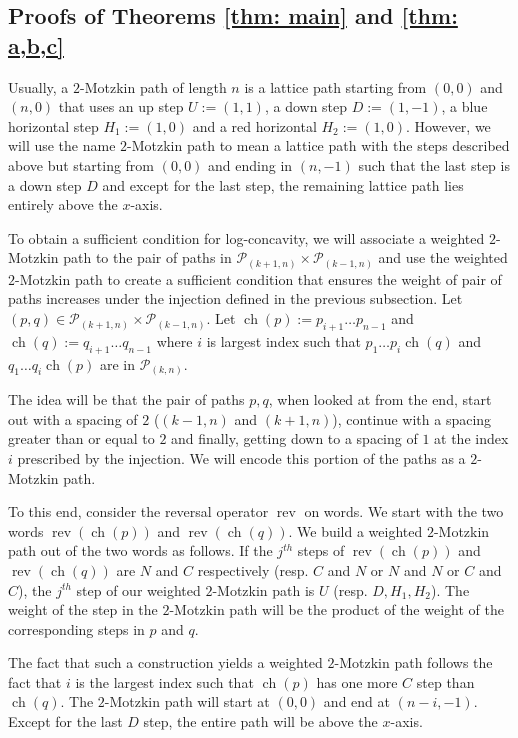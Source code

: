 \documentclass{article}
\newcommand{\lp}{\mathcal{P}}
\DeclareMathOperator{\ch}{ch}
\DeclareMathOperator{\rev}{rev}
\theoremstyle{definition}
\numberwithin{equation}{section}
\begin{document}
\subsection{Proofs of Theorems \ref{thm: main} and \ref{thm: a,b,c}}

Usually, a $2$-Motzkin path of length $n$ is a lattice path starting from $(0,0)$ and $(n,0)$ that uses an up step $U:=(1,1)$, a down step $D:=(1,-1)$, a blue horizontal step $H_1:=(1,0)$ and a red horizontal $H_2:=(1,0)$. However, we will use the name $2$-Motzkin path to mean a lattice path with the steps described above but starting from $(0,0)$ and ending in $(n,-1)$ such that the last step is a down step $D$ and except for the last step, the remaining lattice path lies entirely above the $x$-axis.

To obtain a sufficient condition for log-concavity, we will associate a weighted $2$-Motzkin path to the pair of paths in $\lp_{(k+1,n)}\times \lp_{(k-1,n)}$ and use the weighted $2$-Motzkin path to create a sufficient condition that ensures the weight of pair of paths increases under the injection defined in the previous subsection. Let $(p,q)\in \lp_{(k+1,n)}\times \lp_{(k-1,n)}$. Let $\ch(p):=p_{i+1}\dots p_{n-1}$ and $\ch(q):=q_{i+1}\dots q_{n-1}$ where $i$ is largest index such that $p_1\dots p_i \ch(q)$ and $q_1\dots q_i \ch(p)$ are in $\lp_{(k,n)}$. 

The idea will be that the pair of paths $p,q$, when looked at from the end, start out with a spacing of $2$ ($(k-1,n)$ and $(k+1,n)$), continue with a spacing greater than or equal to $2$ and finally, getting down to a spacing of $1$ at the index $i$ prescribed by the injection. We will encode this portion of the paths as a $2$-Motzkin path.

To this end, consider the reversal operator $\rev$ on words. We start with the two words $\rev(\ch(p))$ and $\rev(\ch(q))$. We build a weighted $2$-Motzkin path out of the two words as follows. If the $j^{th}$ steps of $\rev(\ch(p))$ and $\rev(\ch(q))$ are $N$ and $C$ respectively (resp. $C$ and $N$ or $N$ and $N$ or $C$ and $C$), the $j^{th}$ step of our weighted $2$-Motzkin path is $U$ (resp. $D,H_1,H_2$). The weight of the step in the $2$-Motzkin path will be the product of the weight of the corresponding steps in $p$ and $q$. 

The fact that such a construction yields a weighted $2$-Motzkin path follows the fact that $i$ is the largest index such that $\ch(p)$ has one more $C$ step than $\ch(q)$. The $2$-Motzkin path will start at $(0,0)$ and end at $(n-i,-1)$. Except for the last $D$ step, the entire path will be above the $x$-axis. 
\end{document}
